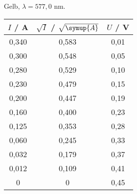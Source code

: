 \begin{subtable}{0.4\textwidth}   
\centering 
 \caption{Gelb, $\lambda = 577,0$ nm.} 
        \begin{tabular}{c c c}
            \toprule
            { $I$ / A} & {$\sqrt{I}$ / $\sqrt{\symup{A}}$} & {$U$ / V} \\
            \midrule
               0,340 & 0,583 & 0,01 \\
               0,300 & 0,548 & 0,05 \\
               0,280 & 0,529 & 0,10 \\
               0,230 & 0,479 & 0,15 \\
               0,200 & 0,447 & 0,19 \\
               0,160 & 0,400 & 0,23 \\
               0,125 & 0,353 & 0,28 \\
               0,060 & 0,245 & 0,33 \\
               0,032 & 0,179 & 0,37 \\
               0,012 & 0,109 & 0,41 \\
               0     & 0 & 0,45 \\ 
            \bottomrule
        \end{tabular}
       
\end{subtable}